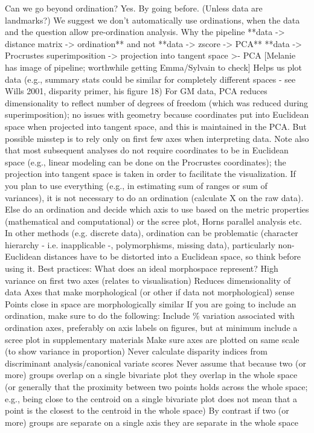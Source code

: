 \documentclass[12pt,letterpaper]{article}
\begin{document}
Can we go beyond ordination? Yes. By going before. (Unless data are landmarks?)
We suggest we don’t automatically use ordinations, when the data and the question allow pre-ordination analysis.
Why the pipeline 
**data -> distance matrix -> ordination** and not
**data -> zscore -> PCA**
**data -> Procrustes superimposition -> projection into tangent space >- PCA [Melanie has image of pipeline; worthwhile getting Emma/Sylvain to check]
Helps us plot data (e.g., summary stats could be similar for completely different spaces - see Wills 2001, disparity primer, his figure 18)
For GM data, PCA reduces dimensionality to reflect number of degrees of freedom (which was reduced during superimposition); no issues with geometry because coordinates put into Euclidean space when projected into tangent space, and this is maintained in the PCA. But possible misstep is to rely only on first few axes when interpreting data. Note also that most subsequent analyses do not require coordinates to be in Euclidean space (e.g., linear modeling can be done on the Procrustes coordinates); the projection into tangent space is taken in order to facilitate the visualization.
If you plan to use everything (e.g., in estimating sum of ranges or sum of variances), it is not necessary to do an ordination (calculate X on the raw data). Else do an ordination and decide which axis to use based on the metric properties (mathematical and computational) or the scree plot, Horns parallel analysis etc.
In other methods (e.g. discrete data), ordination can be problematic (character hierarchy - i.e. inapplicable -, polymorphisms, missing data), particularly non-Euclidean distances have to be distorted into a Euclidean space, so think before using it.
Best practices:
What does an ideal morphospace represent?
High variance on first two axes (relates to visualisation)
Reduces dimensionality of data
Axes that make morphological (or other if data not morphological) sense
Points close in space are morphologically similar
If you are going to include an ordination, make sure to do the following:
Include \% variation associated with ordination axes, preferably on axis labels on figures, but at minimum include a scree plot in supplementary materials
Make sure axes are plotted on same scale (to show variance in proportion)
Never calculate disparity indices from discriminant analysis/canonical variate scores
Never assume that because two (or more) groups overlap on a single bivariate plot they overlap in the whole space (or generally that the proximity between two points holds across the whole space; e.g., being close to the centroid on a single bivariate plot does not mean that a point is the closest to the centroid in the whole space)
By contrast if two (or more) groups are separate on a single axis they are separate in the whole space
\end{document}
